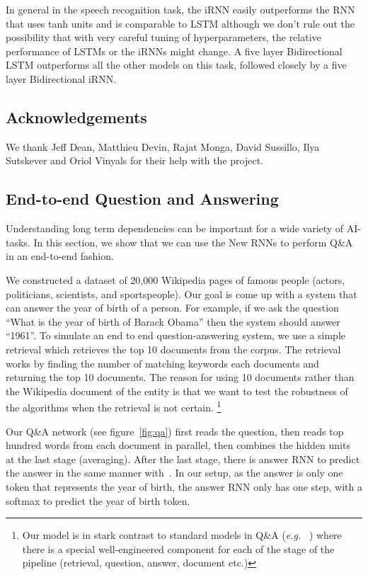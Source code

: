 \documentclass{article} \usepackage{nips14submit_e,times,graphicx}
\begin{document}
In general in the speech recognition task, the iRNN easily outperforms
the RNN that uses tanh units and is comparable to LSTM although we
don't rule out the possibility that with very careful tuning of
hyperparameters, the relative performance of LSTMs or the iRNNs might
change.  A five layer Bidirectional LSTM outperforms all the other
models on this task, followed closely by a five layer Bidirectional
iRNN.


 
\subsection{Acknowledgements}
We thank Jeff Dean, Matthieu Devin, Rajat Monga, David Sussillo, Ilya
Sutskever and Oriol Vinyals for their help with the project.

\iffalse
\subsection{End-to-end Question and Answering}
Understanding long term dependencies can be important for a wide
variety of AI-tasks. In this section, we show that we can use the New
RNNs to perform Q\&A in an end-to-end fashion.

We constructed a dataset of 20,000 Wikipedia pages of famous people
(actors, politicians, scientists, and sportspeople). Our goal is come
up with a system that can answer the year of birth of a person. For
example, if we ask the question ``What is the year of birth of Barack
Obama'' then the system should answer ``1961''. To simulate an end to
end question-answering system, we use a simple retrieval which
retrieves the top 10 documents from the corpus. The retrieval works by
finding the number of matching keywords each documents and returning
the top 10 documents. The reason for using 10 documents rather than
the Wikipedia document of the entity is that we want to test the
robustness of the algorithms when the retrieval is not
certain. \footnote{Our model is in stark contrast to standard models
  in Q\&A ({\it e.g.} ~\cite{ferrucci10}) where there is a special
  well-engineered component for each of the stage of the pipeline
  (retrieval, question, answer, document etc.)}


Our Q\&A network (see figure~\ref{fig:qa}) first reads the question,
then reads top hundred words from each document in parallel, then
combines the hidden units at the last stage (averaging). After the
last stage, there is answer RNN to predict the answer in the same
manner with~\cite{sutskever14}. In our setup, as the answer is only
one token that represents the year of birth, the answer RNN only has
one step, with a softmax to predict the year of birth token.
\end{document}
